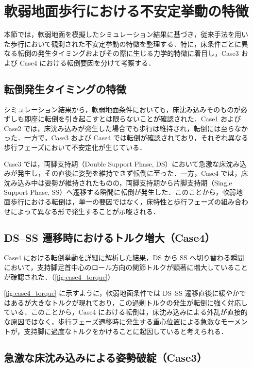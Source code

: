 \section{軟弱地面歩行における不安定挙動の特徴}
\label{sec:sim_instability_feature}

本節では，軟弱地面を模擬したシミュレーション結果に基づき，従来手法を用いた歩行において観測された不安定挙動の特徴を整理する．特に，床条件ごとに異なる転倒の発生タイミングおよびその際に生じる力学的特徴に着目し，Case3 および Case4 における転倒要因を分けて考察する．

\subsection{転倒発生タイミングの特徴}
\label{subsec:fall_timing}

シミュレーション結果から，軟弱地面条件においても，床沈み込みそのものが必ずしも即座に転倒を引き起こすとは限らないことが確認された．Case1 および Case2 では，床沈み込みが発生した場合でも歩行は維持され，転倒には至らなかった．一方で，Case3 および Case4 では転倒が確認されており，それぞれ異なる歩行フェーズにおいて不安定化が生じている．

Case3 では，両脚支持期（Double Support Phase, DS）において急激な床沈み込みが発生し，その直後に姿勢を維持できず転倒に至った．一方，Case4 では，床沈み込み中は姿勢が維持されたものの，両脚支持期から片脚支持期（Single Support Phase, SS）へ遷移する瞬間に転倒が発生した．このことから，軟弱地面歩行における転倒は，単一の要因ではなく，床特性と歩行フェーズの組み合わせによって異なる形で発生することが示唆される．

\subsection{DS--SS 遷移時におけるトルク増大（Case4）}
\label{subsec:torque_increase_case4}

Case4 における転倒挙動を詳細に解析した結果，DS から SS へ切り替わる瞬間において，支持脚足首中心のロール方向の関節トルクが顕著に増大していることが確認された．（\cref{fig:case4_torque}）

\cref{fig:case4_torque} に示すように，軟弱地面条件では DS--SS 遷移直後に緩やかではあるが大きなトルクが現れており，この過剰トルクの発生が転倒に強く対応している．このことから，Case4 における転倒は，床沈み込みによる外乱が直接的な原因ではなく，歩行フェーズ遷移時に発生する重心位置による急激なモーメントが，支持脚に過度なトルクをかけることに起因していると考えられる．

\subsection{急激な床沈み込みによる姿勢破綻（Case3）}
\label{subsec:instability_case3}

